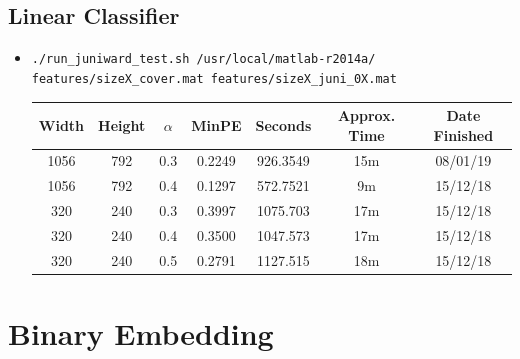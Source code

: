 \documentclass[11pt,a4paper]{report}
\begin{document}
\subsection{Linear Classifier}
\begin{itemize}
\item \texttt{./run\_juniward\_test.sh /usr/local/matlab-r2014a/} \\
         \texttt{features/sizeX\_cover.mat features/sizeX\_juni\_0X.mat}
  \begin{center}
  \begin{tabular}{ c c | c | c | c c c }
  Width & Height & $\alpha$ & MinPE & Seconds & Approx. Time & Date Finished \\ \hline
  1056 & 792 & 0.3 & 0.2249 & 926.3549 & 15m & 08/01/19 \\
  1056 & 792 & 0.4 & 0.1297 & 572.7521 & 9m & 15/12/18 \\
  320 & 240 & 0.3 & 0.3997 & 1075.703 & 17m & 15/12/18 \\
  320 & 240 & 0.4 & 0.3500 & 1047.573 & 17m & 15/12/18 \\
  320 & 240 & 0.5 & 0.2791 & 1127.515 & 18m & 15/12/18 \\
  \end{tabular}
  \end{center}
\end{itemize}


\newpage
\section{Binary Embedding}
\end{document}
